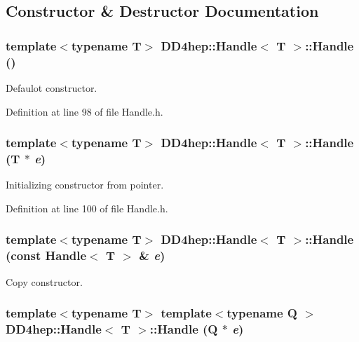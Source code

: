 \subsection{Constructor \& Destructor Documentation}
\hypertarget{class_d_d4hep_1_1_handle_a97b64b3f6c35305e77fe00bc2f73aeb7}{
\subsubsection[{Handle}]{\setlength{\rightskip}{0pt plus 5cm}template$<$typename T$>$ {\bf DD4hep::Handle}$<$ {\bf T} $>$::{\bf Handle} ()}}
\label{class_d_d4hep_1_1_handle_a97b64b3f6c35305e77fe00bc2f73aeb7}


Defaulot constructor. 

Definition at line 98 of file Handle.h.\hypertarget{class_d_d4hep_1_1_handle_aae5fd1b909826186406e57e41679ab8d}{
\subsubsection[{Handle}]{\setlength{\rightskip}{0pt plus 5cm}template$<$typename T$>$ {\bf DD4hep::Handle}$<$ {\bf T} $>$::{\bf Handle} ({\bf T} $\ast$ {\em e})}}
\label{class_d_d4hep_1_1_handle_aae5fd1b909826186406e57e41679ab8d}


Initializing constructor from pointer. 

Definition at line 100 of file Handle.h.\hypertarget{class_d_d4hep_1_1_handle_ae0d7f77a5c4bb5dd1662c694f59eee6e}{
\subsubsection[{Handle}]{\setlength{\rightskip}{0pt plus 5cm}template$<$typename T$>$ {\bf DD4hep::Handle}$<$ {\bf T} $>$::{\bf Handle} (const {\bf Handle}$<$ {\bf T} $>$ \& {\em e})}}
\label{class_d_d4hep_1_1_handle_ae0d7f77a5c4bb5dd1662c694f59eee6e}


Copy constructor. \hypertarget{class_d_d4hep_1_1_handle_a3e6a892a565350ab440205c4ec2e06f8}{
\subsubsection[{Handle}]{\setlength{\rightskip}{0pt plus 5cm}template$<$typename T$>$ template$<$typename Q $>$ {\bf DD4hep::Handle}$<$ {\bf T} $>$::{\bf Handle} (Q $\ast$ {\em e})}}
\label{class_d_d4hep_1_1_handle_a3e6a892a565350ab440205c4ec2e06f8}



